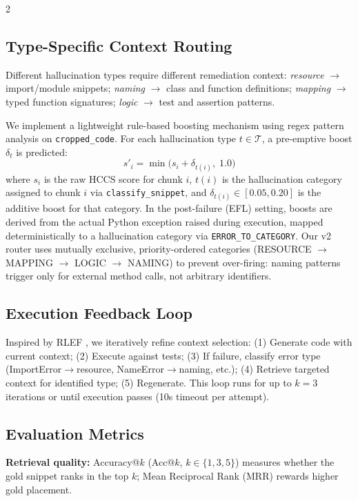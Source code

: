 \documentclass[11pt,a4paper]{article}
\begin{document}
\begin{multicols}{2}
\subsection{Type-Specific Context Routing}

Different hallucination types require different remediation context: \textit{resource} $\rightarrow$ import/module snippets; \textit{naming} $\rightarrow$ class and function definitions; \textit{mapping} $\rightarrow$ typed function signatures; \textit{logic} $\rightarrow$ test and assertion patterns.

We implement a lightweight rule-based boosting mechanism using regex pattern analysis on \texttt{cropped\_code}. For each hallucination type $t \in \mathcal{T}$, a pre-emptive boost $\delta_t$ is predicted:
\begin{equation}
s'_i = \min\!\big(s_i + \delta_{t(i)},\; 1.0\big)
\end{equation}
where $s_i$ is the raw HCCS score for chunk $i$, $t(i)$ is the hallucination category assigned to chunk $i$ via \texttt{classify\_snippet}, and $\delta_{t(i)} \in [0.05, 0.20]$ is the additive boost for that category. In the post-failure (EFL) setting, boosts are derived from the actual Python exception raised during execution, mapped deterministically to a hallucination category via \texttt{ERROR\_TO\_CATEGORY}. Our v2 router uses mutually exclusive, priority-ordered categories (RESOURCE $\rightarrow$ MAPPING $\rightarrow$ LOGIC $\rightarrow$ NAMING) to prevent over-firing: naming patterns trigger only for external method calls, not arbitrary identifiers.

\subsection{Execution Feedback Loop}

Inspired by RLEF \citep{gehring2024rlef}, we iteratively refine context selection: (1) Generate code with current context; (2) Execute against tests; (3) If failure, classify error type (ImportError$\rightarrow$resource, NameError$\rightarrow$naming, etc.); (4) Retrieve targeted context for identified type; (5) Regenerate. This loop runs for up to $k=3$ iterations or until execution passes (10s timeout per attempt).

\subsection{Evaluation Metrics}

\textbf{Retrieval quality:} Accuracy@$k$ (Acc@$k$, $k \in \{1, 3, 5\}$) measures whether the gold snippet ranks in the top $k$; Mean Reciprocal Rank (MRR) rewards higher gold placement.


\end{multicols}
\end{document}
